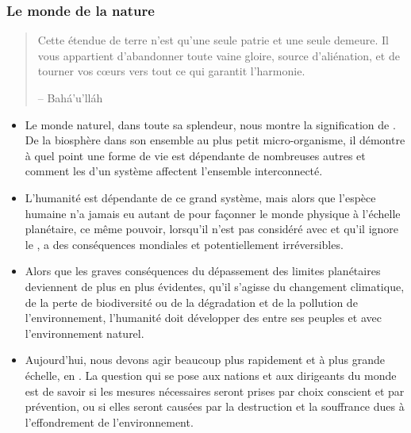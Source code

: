 \documentclass[11pt,xcolor={dvipsnames},hyperref={pdftex,pdfpagemode=UseNone,hidelinks,pdfdisplaydoctitle=true},usepdftitle=false]{beamer}
\begin{document}
\begin{frame}
\end{frame}

\begin{frame}[allowframebreaks=0.8]
  \frametitle{Le monde de la nature}
  \begin{quote}
     Cette étendue de terre n’est qu’une seule patrie et une seule demeure. Il 
     vous appartient d’abandonner toute vaine gloire, source d’aliénation, et 
     de tourner vos cœurs vers tout ce qui garantit l’harmonie.

     \raggedleft -- Bahá'u'lláh
  \end{quote}
  \begin{itemize}
    \item Le monde naturel, dans toute sa splendeur, nous montre la
      signification de . De la biosphère dans son ensemble au
      plus petit micro-organisme, il démontre à quel point une forme de vie est
      dépendante de nombreuses autres et comment les  d'un système
      affectent l'ensemble interconnecté.
    \item L'humanité est dépendante de ce grand système, mais alors que
      l'espèce humaine n'a jamais eu autant de  pour façonner le monde
      physique à l'échelle planétaire, ce même pouvoir, lorsqu'il n'est pas
      considéré avec  et qu'il ignore le ,
      a des conséquences mondiales et potentiellement irréversibles.
    \item Alors que les graves conséquences du dépassement des limites
      planétaires deviennent de plus en plus évidentes, qu'il s'agisse du
      changement climatique, de la perte de biodiversité ou de la dégradation et
      de la pollution de l'environnement, l'humanité doit développer des
       entre ses peuples et avec
      l'environnement naturel.
    \item Aujourd'hui, nous devons agir beaucoup plus rapidement et à plus
      grande échelle, en . La question qui se pose aux nations et aux dirigeants
      du monde est de savoir si les mesures nécessaires seront prises par choix
      conscient et par prévention, ou si elles seront causées par la
      destruction et la souffrance dues à l'effondrement de l'environnement.
  \end{itemize}
\end{frame}
\end{document}
